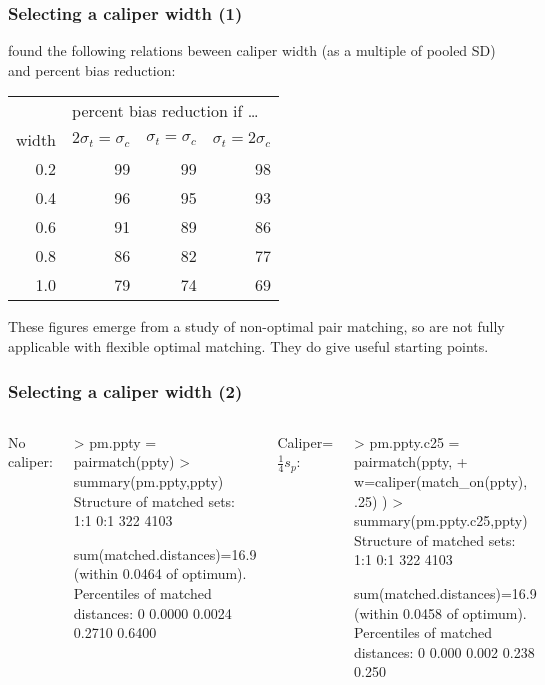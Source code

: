 \begin{frame}[label=selectCalFr]
  \frametitle{Selecting a caliper width (1)}

\citet{coch:rubi:1973} found the following
relations beween caliper width (as a multiple of
pooled SD) and percent bias reduction:
{\footnotesize
\begin{center}
\begin{tabular}{r|rrr} \hline
      &  \multicolumn{3}{l}{percent bias reduction if \ldots}\\
width & $2\sigma_t = \sigma_c$ &  $\sigma_t=\sigma_c$
      &  $\sigma_t= 2\sigma_c$ \\ \hline
0.2 & 99 & 99 & 98 \\
0.4 & 96 & 95 & 93 \\
0.6 & 91 & 89 & 86 \\
0.8 & 86 & 82 & 77 \\
1.0 & 79 & 74 & 69 \\ \hline
\end{tabular}
\end{center}
}

These figures emerge from a study of non-optimal pair matching, so are
not fully applicable with flexible optimal matching.  They do give
useful starting points.
\end{frame}

\begin{frame}[fragile]
  \frametitle{Selecting a caliper width (2)}

  \begin{columns}
{
  \begin{center}
{    No caliper: }
  \end{center}
{\footnotesize
    \begin{semiverbatim}
> pm.ppty = pairmatch(ppty)
> summary(pm.ppty,ppty)
Structure of matched sets:
 1:1  0:1
 322 4103

sum(matched.distances)=16.9
(within 0.0464 of optimum).
Percentiles of matched distances:
    0%
0.0000 0.0024 0.2710 0.6400

    \end{semiverbatim}
}
}
{
  \begin{center}
    { Caliper=$\frac{1}{4} s_{p}$: }
  \end{center}
{\footnotesize
  \begin{semiverbatim}
> pm.ppty.c25 = pairmatch(ppty, 
+  w=caliper(match_on(ppty), .25) )
> summary(pm.ppty.c25,ppty)
Structure of matched sets:
 1:1  0:1
 322 4103

sum(matched.distances)=16.9
(within 0.0458 of optimum).
Percentiles of matched distances:
   0%
0.000 0.002 0.238 0.250
  \end{semiverbatim}
}
}
  \end{columns}
\bigskip

\end{frame}


